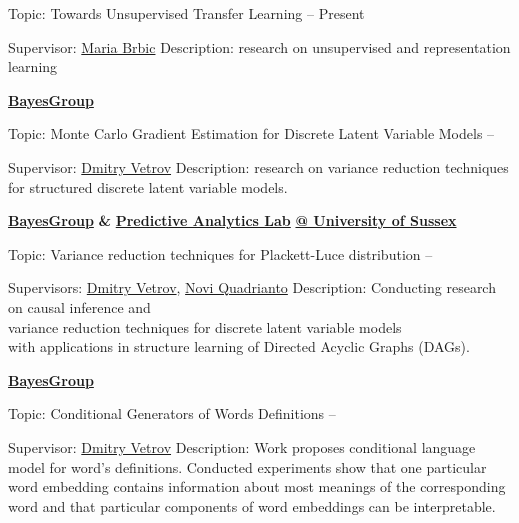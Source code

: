 \documentclass[letterpaper,MMMyyyy,nonstopmode]{simpleresumecv}
\begin{document}
\begin{Body}
\BulletItem
Topic: Towards Unsupervised Transfer Learning
\hfill
{} --
Present
\begin{Detail}
\SubBulletItem
Supervisor:
\href{https://people.epfl.ch/maria.brbic}{Maria Brbic}
\SubBulletItem
Description: research on unsupervised and representation learning
\end{Detail}

\Entry
\href{https://bayesgroup.ru}
{\textbf{BayesGroup}}

\BulletItem
Topic: Monte Carlo Gradient Estimation for Discrete Latent Variable Models
\hfill
{} --
\begin{Detail}
\SubBulletItem
Supervisor:
\href{https://bayesgroup.ru/people/dmitry-vetrov/}{Dmitry Vetrov}
\SubBulletItem
Description: research on variance reduction techniques
\newline
for structured discrete latent variable models.
\end{Detail}

\Entry
\href{https://bayesgroup.ru}
{\textbf{BayesGroup}} \textbf{\&} \href{https://wearepal.ai}{\textbf{Predictive Analytics Lab}} \href{http://sussex.ac.uk}{\textbf{@ University of Sussex}}

\BulletItem
Topic: Variance reduction techniques for Plackett-Luce distribution
\hfill
{} --
\begin{Detail}
\SubBulletItem
Supervisors:
\href{https://bayesgroup.ru/people/dmitry-vetrov/}{Dmitry Vetrov}, \href{https://profiles.sussex.ac.uk/p335583-novi-quadrianto}{Novi Quadrianto}
\SubBulletItem
Description:
Conducting research on causal inference and\\ variance reduction techniques for discrete latent variable models\\ with applications in structure learning of Directed Acyclic Graphs (DAGs).
\end{Detail}

\Entry
\href{https://bayesgroup.ru}
{\textbf{BayesGroup}}

\Gap
\BulletItem
Topic: Conditional Generators of Words Definitions
\hfill
{} --
\begin{Detail}
\SubBulletItem
Supervisor:
\href{https://bayesgroup.ru/people/dmitry-vetrov/}{Dmitry Vetrov}
\SubBulletItem
Description:
Work proposes conditional language model for word’s definitions. \newline
Conducted experiments show that one particular word embedding contains \newline
information about most meanings of the corresponding word and that \newline
particular components of word embeddings can be interpretable.
\end{Detail}


\end{Body}
\end{document}
